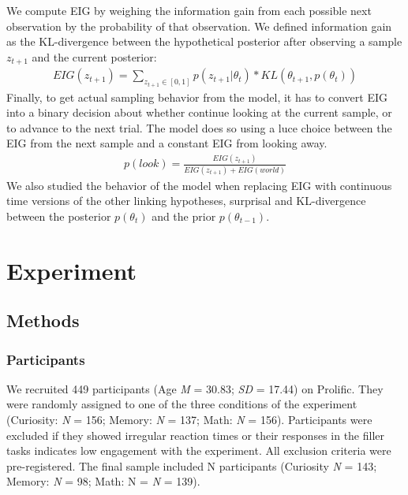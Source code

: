 \documentclass[10pt, letterpaper]{article}
\begin{document}
We compute EIG by weighing the information gain from each possible next
observation by the probability of that observation. We defined
information gain as the KL-divergence between the hypothetical posterior
after observing a sample \(z_{t+1}\) and the current posterior:
\begin{eqnarray}
EIG(z_{t+1}) = \sum_{z_{t+1} \in [0,1]} p(z_{t+1}|\theta_t) * KL(\theta_{t+1}, p(\theta_t))
\end{eqnarray} Finally, to get actual sampling behavior from the model,
it has to convert EIG into a binary decision about whether continue
looking at the current sample, or to advance to the next trial. The
model does so using a luce choice between the EIG from the next sample
and a constant EIG from looking away. \begin{eqnarray}
p(look) = \frac{EIG(z_{t+1})}{EIG(z_{t+1})+EIG(world)}
\end{eqnarray} We also studied the behavior of the model when replacing
EIG with continuous time versions of the other linking hypotheses,
surprisal and KL-divergence between the posterior \(p(\theta_t)\) and
the prior \(p(\theta_{t-1})\).

\hypertarget{experiment}{%
\section{Experiment}\label{experiment}}

\hypertarget{methods}{%
\subsection{Methods}\label{methods}}

\hypertarget{participants}{%
\subsubsection{Participants}\label{participants}}

We recruited 449 participants (Age \emph{M} = 30.83; \emph{SD} = 17.44)
on Prolific. They were randomly assigned to one of the three conditions
of the experiment (Curiosity: \emph{N} = 156; Memory: \emph{N} = 137;
Math: \emph{N} = 156). Participants were excluded if they showed
irregular reaction times or their responses in the filler tasks
indicates low engagement with the experiment. All exclusion criteria
were pre-registered. The final sample included N participants (Curiosity
\emph{N} = 143; Memory: \emph{N} = 98; Math: N = \emph{N} = 139).
\end{document}
